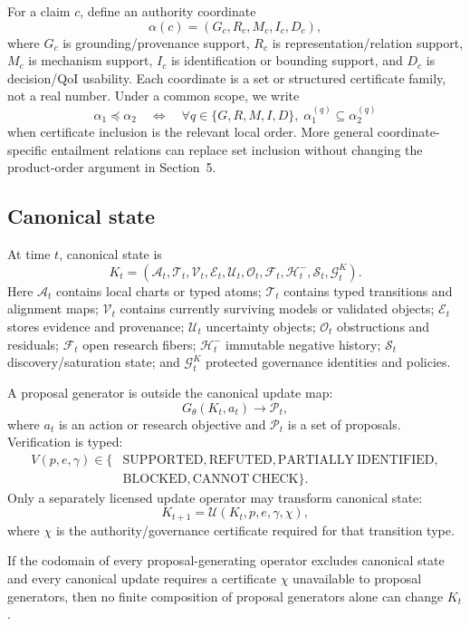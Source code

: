 For a claim \(c\), define an authority coordinate
\[
\alpha(c)=(G_c,R_c,M_c,I_c,D_c),
\]
where \(G_c\) is grounding/provenance support, \(R_c\) is representation/relation support, \(M_c\) is mechanism support, \(I_c\) is identification or bounding support, and \(D_c\) is decision/QoI usability. Each coordinate is a set or structured certificate family, not a real number. Under a common scope, we write
\[
\alpha_1\preceq\alpha_2
\quad\Longleftrightarrow\quad
\forall q\in\{G,R,M,I,D\},\; \alpha_1^{(q)}\subseteq \alpha_2^{(q)}
\]
when certificate inclusion is the relevant local order. More general coordinate-specific entailment relations can replace set inclusion without changing the product-order argument in Section~5.

\subsection{Canonical state}

At time \(t\), canonical state is
\[
K_t=(\mathcal A_t,\mathcal T_t,\mathcal V_t,\mathcal E_t,\mathcal U_t,
\mathcal O_t,\mathcal F_t,\mathcal H_t^{-},\mathcal S_t,\mathcal G_t^K).
\]
Here \(\mathcal A_t\) contains local charts or typed atoms; \(\mathcal T_t\) contains typed transitions and alignment maps; \(\mathcal V_t\) contains currently surviving models or validated objects; \(\mathcal E_t\) stores evidence and provenance; \(\mathcal U_t\) uncertainty objects; \(\mathcal O_t\) obstructions and residuals; \(\mathcal F_t\) open research fibers; \(\mathcal H_t^{-}\) immutable negative history; \(\mathcal S_t\) discovery/saturation state; and \(\mathcal G_t^K\) protected governance identities and policies.

A proposal generator is outside the canonical update map:
\[
G_\theta(K_t,a_t)\longrightarrow \mathcal P_t,
\]
where \(a_t\) is an action or research objective and \(\mathcal P_t\) is a set of proposals. Verification is typed:
\[
\begin{aligned}
V(p,e,\gamma)\in\{&\mathrm{SUPPORTED},\mathrm{REFUTED},\mathrm{PARTIALLY\ IDENTIFIED},\\
&\mathrm{BLOCKED},\mathrm{CANNOT\ CHECK}\}.
\end{aligned}
\]
Only a separately licensed update operator may transform canonical state:
\[
K_{t+1}=\mathcal U(K_t,p,e,\gamma,\chi),
\]
where \(\chi\) is the authority/governance certificate required for that transition type.

\begin{proposition}
If the codomain of every proposal-generating operator excludes canonical state and every canonical update requires a certificate \(\chi\) unavailable to proposal generators, then no finite composition of proposal generators alone can change \(K_t\).
\end{proposition}

